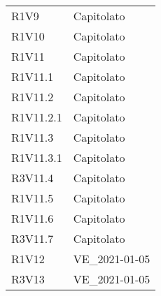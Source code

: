 {\begin{longtable}{C{3cm} C{12.5cm}}
R1V9 & Capitolato \\

R1V10 & Capitolato \\

R1V11 & Capitolato \\
R1V11.1 & Capitolato \\
R1V11.2 & Capitolato \\
R1V11.2.1 & Capitolato \\
R1V11.3 & Capitolato \\
R1V11.3.1 & Capitolato \\
R3V11.4 & Capitolato \\

R1V11.5 & Capitolato \\
R1V11.6 & Capitolato \\
R3V11.7 & Capitolato \\

R1V12 & VE\_2021-01-05 \\
R3V13 & VE\_2021-01-05 \\

\end{longtable}

}
